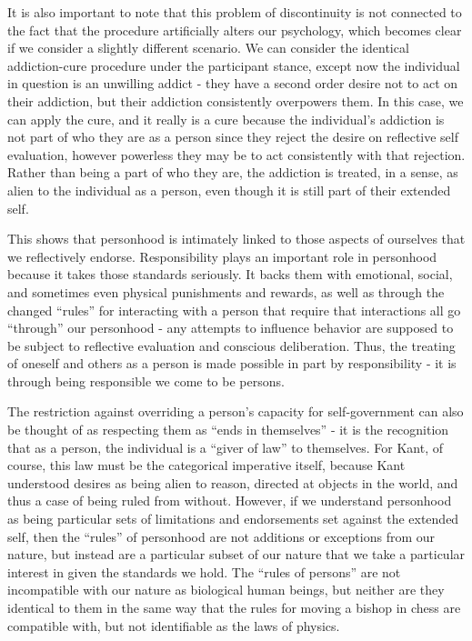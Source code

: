 \documentclass[phd,12pt,oneside,paper=letterpaper]{ubcthesis}
\begin{document}
It is also important to note that this problem of discontinuity is not connected to the fact that the procedure artificially alters our psychology, which becomes clear if we consider a slightly different scenario. We can consider the identical addiction-cure procedure under the participant stance, except now the individual in question is an unwilling addict - they have a second order desire not to act on their addiction, but their addiction consistently overpowers them. In this case, we can apply the cure, and it really is a cure because the individual's addiction is not part of who they are as a person since they reject the desire on reflective self evaluation, however powerless they may be to act consistently with that rejection. Rather than being a part of who they are, the addiction is treated, in a sense, as alien to the individual as a person, even though it is still part of their extended self. 

This shows that personhood is intimately linked to those aspects of ourselves that we reflectively endorse. Responsibility plays an important role in personhood because it takes those standards seriously. It backs them with emotional, social, and sometimes even physical punishments and rewards, as well as through the changed ``rules'' for interacting with a person that require that interactions all go ``through'' our personhood - any attempts to influence behavior are supposed to be subject to reflective evaluation and conscious deliberation. Thus, the treating of oneself and others as a person is made possible in part by responsibility - it is through being responsible we come to be persons.

The restriction against overriding a person's capacity for self-government can also be thought of as respecting them as ``ends in themselves'' - it is the recognition that as a person, the individual is a ``giver of law'' to themselves. For Kant, of course, this law must be the categorical imperative itself, because Kant understood desires as being alien to reason, directed at objects in the world, and thus a case of being ruled from without. However, if we understand personhood as being particular sets of limitations and endorsements set against the extended self, then the ``rules'' of personhood are not additions or exceptions from our nature, but instead are a particular subset of our nature that we take a particular interest in given the standards we hold. The ``rules of persons'' are not incompatible with our nature as biological human beings, but neither are they identical to them in the same way that the rules for moving a bishop in chess are compatible with, but not identifiable as the laws of physics. 
\end{document}
